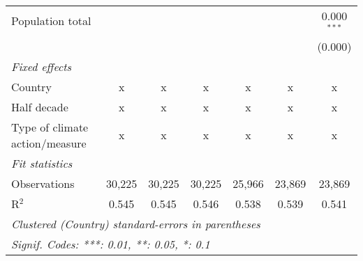 \begin{tabular}{lcccccc}
   Population total                                                       &         &             &              &              &              & 0.000$^{***}$\\   
                                                                          &         &             &              &              &              & (0.000)\\   
   \emph{Fixed effects}\\
   Country                                                                & x       & x           & x            & x            & x            & x\\  
   Half decade                                                            & x       & x           & x            & x            & x            & x\\  
   Type of climate action/measure                                         & x       & x           & x            & x            & x            & x\\  
   \midrule \emph{Fit statistics}\\
   Observations                                                           & 30,225  & 30,225      & 30,225       & 25,966       & 23,869       & 23,869\\  
   R$^2$                                                                  & 0.545   & 0.545       & 0.546        & 0.538        & 0.539        & 0.541\\  
   \midrule
   \multicolumn{7}{l}{\emph{Clustered (Country) standard-errors in parentheses}}\\
   \multicolumn{7}{l}{\emph{Signif. Codes: ***: 0.01, **: 0.05, *: 0.1}}\\
\end{tabular}
\par\endgroup


